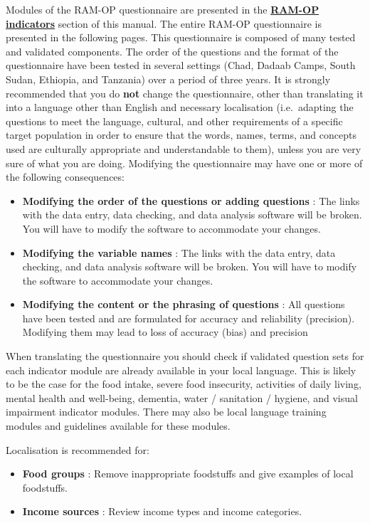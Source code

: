 \documentclass[12pt,a4paper]{book}
\providecommand{\tightlist}{%
  \setlength{\itemsep}{0pt}\setlength{\parskip}{0pt}}
\theoremstyle{definition}
\theoremstyle{definition}
\theoremstyle{definition}
\theoremstyle{remark}
\begin{document}
Modules of the RAM-OP questionnaire are presented in the
\protect\hyperlink{indicators}{\textbf{RAM-OP indicators}} section of
this manual. The entire RAM-OP questionnaire is presented in the
following pages. This questionnaire is composed of many tested and
validated components. The order of the questions and the format of the
questionnaire have been tested in several settings (Chad, Dadaab Camps,
South Sudan, Ethiopia, and Tanzania) over a period of three years. It is
strongly recommended that you do \textbf{not} change the questionnaire,
other than translating it into a language other than English and
necessary localisation (i.e.~adapting the questions to meet the
language, cultural, and other requirements of a specific target
population in order to ensure that the words, names, terms, and concepts
used are culturally appropriate and understandable to them), unless you
are very sure of what you are doing. Modifying the questionnaire may
have one or more of the following consequences:

\begin{itemize}
\item
  \textbf{Modifying the order of the questions or adding questions} :
  The links with the data entry, data checking, and data analysis
  software will be broken. You will have to modify the software to
  accommodate your changes.
\item
  \textbf{Modifying the variable names} : The links with the data entry,
  data checking, and data analysis software will be broken. You will
  have to modify the software to accommodate your changes.
\item
  \textbf{Modifying the content or the phrasing of questions} : All
  questions have been tested and are formulated for accuracy and
  reliability (precision). Modifying them may lead to loss of accuracy
  (bias) and precision
\end{itemize}

When translating the questionnaire you should check if validated
question sets for each indicator module are already available in your
local language. This is likely to be the case for the food intake,
severe food insecurity, activities of daily living, mental health and
well-being, dementia, water / sanitation / hygiene, and visual
impairment indicator modules. There may also be local language training
modules and guidelines available for these modules.

Localisation is recommended for:

\begin{itemize}
\tightlist
\item
  \textbf{Food groups} : Remove inappropriate foodstuffs and give
  examples of local foodstuffs.
\item
  \textbf{Income sources} : Review income types and income categories.
\end{itemize}
\end{document}
